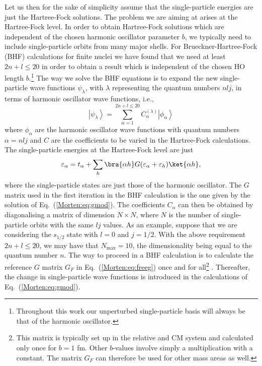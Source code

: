 Let us then for the sake of simplicity assume that the single-particle
energies are just the Hartree-Fock solutions. The problem we are
aiming at arises at the Hartree-Fock level.  In order to obtain
Hartree-Fock solutions which are independent of the chosen harmonic
oscillator parameter $b$, we typically need to include single-particle
orbits from many major shells.  For 
Brueckner-Hartree-Fock (BHF) calculations for finite nuclei we have
found that we need at least $2n+l \leq 20$ in order to obtain a result
which is independent of the chosen HO length $b$.\footnote{Throughout this work
our unperturbed single-particle basis will always be
that of the harmonic oscillator.} 
The way we solve the BHF
equations is to expand the new single-particle wave functions
$\psi_{\lambda}$, with $\lambda$ representing the quantum numbers
$nlj$, in terms of harmonic oscillator wave functions, i.e.,
\begin{equation}
     \left | \psi_{\lambda}\right\rangle=
     \sum_{\alpha =1}^{2n+l\leq 20} 
     C_{\alpha}^{(\lambda )}\left | \phi_{\alpha}\right\rangle
     \label{Morten:eq:selfconstbasis}
\end{equation}
where $\phi_{\alpha}$ are the harmonic oscillator wave functions
with quantum numbers $\alpha=nlj$ and $C$ are the coefficients
to be varied in the Hartree-Fock calculations.
The single-particle energies at the 
Hartree-Fock level are just
\begin{equation}
  \varepsilon_{\alpha}=t_{\alpha}+
   \sum_h \bra{\alpha h} G(\varepsilon_{\alpha}+
                           \varepsilon_h)
          \ket{\alpha h},
\end{equation}
where the single-particle states are just those
of the harmonic oscillator. The $G$ matrix used in the 
first iteration in the BHF calculation is the one given
by the solution of Eq.~(\ref{Morten:eq:gmod}).
The coefficients 
$C_{\alpha}$ can then be obtained by diagonalising
a matrix of dimension $N\times N$, where $N$ is the number
of single-particle orbits with the same $lj$ values.
As an example, suppose that we are considering the 
$s_{1/2}$ state with $l=0$ and $j=1/2$. With the above
requirement $2n+l\leq 20$, we may have
that $N_{\mathrm{max}}=10$, the dimensionality being equal to 
the quantum number $n$. 
The way to proceed in a BHF calculation is to calculate
the reference $G$ matrix $G_F$ in Eq.~(\ref{Morten:eq:freeg})
once and for all\footnote{This matrix is typically
set up in the relative and CM system and calculated
only once 
for $b=1$ fm. Other $b$-values involve simply
a multiplication with a constant. The matrix $G_F$ can therefore
be used for other mass areas as well.} .
Thereafter, the change in single-particle wave functions
is introduced in the calculations of Eq.~(\ref{Morten:eq:gmod}).


